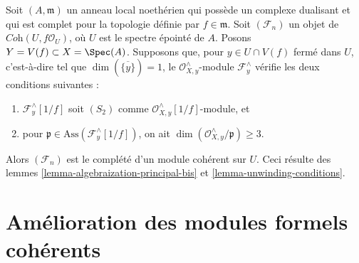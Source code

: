 \begin{remark}
\label{remark-interesting-case-bis}
Soit $(A, \mathfrak m)$ un anneau local noethérien qui possède un
complexe dualisant et qui est complet pour la topologie définie par $f \in \mathfrak m$.
Soit $(\mathcal{F}_n)$ un objet de $\textit{Coh}(U, f\mathcal{O}_U)$,
où $U$ est le spectre épointé de $A$.
Posons $Y = V(f) \subset X = \Spec(A)$.
Supposons que, pour $y \in U \cap V(f)$ fermé dans $U$, c'est-à-dire tel que
$\dim(\overline{\{y\}}) = 1$, le
$\mathcal{O}_{X, y}^\wedge$-module $\mathcal{F}_y^\wedge$
vérifie les deux conditions suivantes :
\begin{enumerate}
\item $\mathcal{F}_y^\wedge[1/f]$ soit $(S_2)$ comme
$\mathcal{O}_{X, y}^\wedge[1/f]$-module, et
\item pour $\mathfrak p \in \text{Ass}(\mathcal{F}_y^\wedge[1/f])$,
on ait $\dim(\mathcal{O}_{X, y}^\wedge/\mathfrak p) \geq 3$.
\end{enumerate}
Alors $(\mathcal{F}_n)$ est le complété d'un module cohérent sur $U$.
Ceci résulte des lemmes \ref{lemma-algebraization-principal-bis}
et \ref{lemma-unwinding-conditions}.
\end{remark}
































\section{Amélioration des modules formels cohérents}
\label{section-improving-formal-modules}

